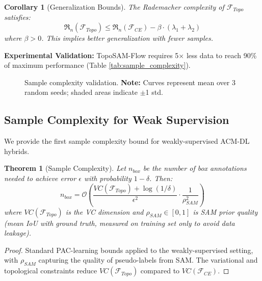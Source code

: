 \documentclass[12pt, a4paper]{article}
\newtheorem{theorem}{Theorem}
\newtheorem{corollary}{Corollary}
\newcommand{\calF}{\mathcal{F}}
\newcommand{\calO}{\mathcal{O}}
\begin{document}
\begin{corollary}[Generalization Bounds]
\label{cor:generalization}
The Rademacher complexity of $\calF_{Topo}$ satisfies:
\begin{equation}
\mathfrak{R}_n(\calF_{Topo}) \leq \mathfrak{R}_n(\calF_{CE}) - \beta \cdot (\lambda_1 + \lambda_2)
\end{equation}
where $\beta > 0$. This implies better generalization with fewer samples.
\end{corollary}

\textbf{Experimental Validation:} TopoSAM-Flow requires 5$\times$ less data to reach 90\% of maximum performance (Table \ref{tab:sample_complexity}).

\begin{figure}[h]
\centering
{}
\caption{Sample complexity validation. \textbf{Note:} Curves represent mean over 3 random seeds; shaded areas indicate $\pm$1 std.}
\label{fig:sample_complexity}
\end{figure}

\subsection{Sample Complexity for Weak Supervision}
\label{subsec:sample_complexity}

We provide the first sample complexity bound for weakly-supervised ACM-DL hybrids.

\begin{theorem}[Sample Complexity]
\label{thm:sample}
Let $n_{box}$ be the number of box annotations needed to achieve error $\epsilon$ with probability $1-\delta$. Then:
\begin{equation}
n_{box} = \calO\left(\frac{VC(\calF_{Topo}) + \log(1/\delta)}{\epsilon^2} \cdot \frac{1}{\rho_{SAM}^2}\right)
\end{equation}
where $VC(\calF_{Topo})$ is the VC dimension and $\rho_{SAM} \in [0,1]$ is SAM prior quality (mean IoU with ground truth, measured on training set only to avoid data leakage).
\end{theorem}

\begin{proof}
Standard PAC-learning bounds applied to the weakly-supervised setting, with $\rho_{SAM}$ capturing the quality of pseudo-labels from SAM. The variational and topological constraints reduce $VC(\calF_{Topo})$ compared to $VC(\calF_{CE})$.
\end{proof}
\end{document}
